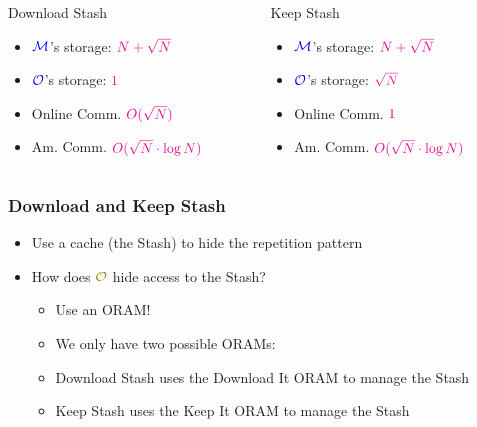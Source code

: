 \documentclass[]{beamer}
\newcommand{\owner}{\mathcal{O}}
\newcommand{\manager}{\mathcal{M}}
\begin{document}
{\begin{frame}[label=recap]
\noindent
\begin{columns}[t]
\begin{column}{5cm}
\begin{block}{\hyperlink{firstConst<8>}{}\hfill Download Stash}
\begin{itemize}
\item $\color{blue} \manager$'s storage: $\color{magenta}N+\sqrt{N}$
\item $\color{blue} \owner$'s storage: $\color{magenta}1$
\item {\color{blue} Online Comm.} $\color{magenta} O(\sqrt{N})$
\item {\color{blue} Am. Comm.} $\color{magenta} O(\sqrt{N}\cdot \log N)$
\end{itemize}
\end{block}
\end{column}
\begin{column}{5cm}

\begin{block}{\hyperlink{secondConst<9>}{}\hfill Keep Stash}
\begin{itemize}
\item $\color{blue} \manager$'s storage: $\color{magenta}N+\sqrt{N}$
\item $\color{blue} \owner$'s storage: $\color{magenta}\sqrt{N}$
\item {\color{blue} Online Comm.} $\color{magenta} 1$
\item {\color{blue} Am. Comm.} $\color{magenta} O(\sqrt{N}\cdot \log N)$
\end{itemize}
\end{block}
\end{column}
\end{columns}
\end{frame}

\begin{frame}
\frametitle{Download and Keep Stash}

\begin{itemize}[<+->]
\item Use a cache (the {\color{teal} Stash}) to hide the repetition  pattern
\item How does $\color{olive}\owner$ hide access to the {\color{teal} Stash}?
    \begin{itemize}
        \item Use an ORAM!
        \item We only have two possible ORAMs:
        \item {\color{blue} Download Stash} uses the {\color{blue} Download It} ORAM
            to manage the {\color{teal} Stash}
        \item {\color{blue} Keep Stash} uses the {\color{blue} Keep It} ORAM
            to manage the {\color{teal} Stash}
    \end{itemize}
\end{itemize}


\end{frame}}
\end{document}
